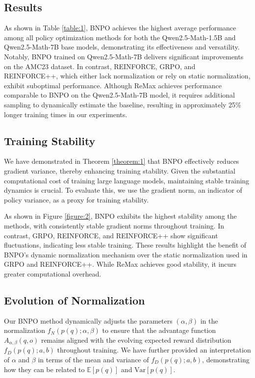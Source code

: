 \documentclass{article}
\theoremstyle{plain}
\theoremstyle{definition}
\theoremstyle{remark}
\begin{document}
\subsection{Results}
\label{section:5.2}
As shown in Table \ref{table:1}, BNPO achieves the highest average performance among all policy optimization methods for both the Qwen2.5-Math-1.5B and Qwen2.5-Math-7B base models, demonstrating its effectiveness and versatility. Notably, BNPO trained on Qwen2.5-Math-7B delivers significant improvements on the AMC23 dataset. In contrast, REINFORCE, GRPO, and REINFORCE++, which either lack normalization or rely on static normalization, exhibit suboptimal performance. Although ReMax achieves performance comparable to BNPO on the Qwen2.5-Math-7B model, it requires additional sampling to dynamically estimate the baseline, resulting in approximately 25\% longer training times in our experiments.




\subsection{Training Stability}
\label{section:5.3}
We have demonstrated in Theorem \ref{theorem:1} that BNPO effectively reduces gradient variance, thereby enhancing training stability. Given the substantial computational cost of training large language models, maintaining stable training dynamics is crucial. To evaluate this, we use the gradient norm, an indicator of policy variance, as a proxy for training stability.

As shown in Figure \ref{figure:2}, BNPO exhibits the highest stability among the methods, with consistently stable gradient norms throughout training. In contrast, GRPO, REINFORCE, and REINFORCE++ show significant fluctuations, indicating less stable training. These results highlight the benefit of BNPO’s dynamic normalization mechanism over the static normalization used in GRPO and REINFORCE++. While ReMax achieves good stability, it incurs greater computational overhead.


\subsection{Evolution of Normalization}
\label{section:5.4}
Our BNPO method dynamically adjusts the parameters \((\alpha, \beta)\) in the normalization \(f_{N}(p(q); \alpha, \beta)\) to ensure that the advantage function \(A_{\alpha, \beta}(q, o)\) remains aligned with the evolving expected reward distribution \(f_{D}(p(q); a, b)\) throughout training. We have further provided an interpretation of \(\alpha\) and \(\beta\) in terms of the mean and variance of \(f_{D}(p(q); a, b)\), demonstrating how they can be related to \(\mathbb{E}[p(q)]\) and \(\mathrm{Var}[p(q)]\).
\end{document}
